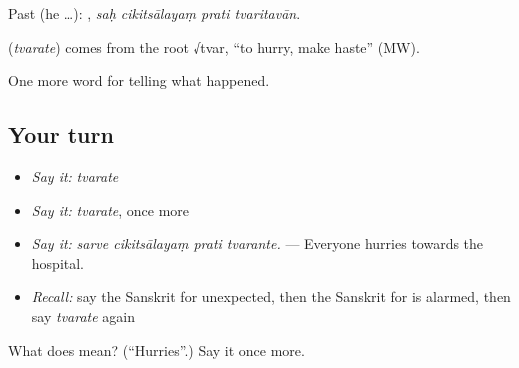 Past (he …):    , \emph{saḥ cikitsālayaṃ prati tvaritavān}.

\begin{cousinweb}
\textbf{} (\emph{tvarate}) comes from the root √tvar, \textquotedblleft{}to hurry, make haste\textquotedblright{} (MW).
\end{cousinweb}

\begin{grammarlens}[title={What you've built}]
One more word for telling what happened.
\end{grammarlens}

\subsection*{Your turn}
\begin{itemize}
\raggedright
  \item \emph{Say it:} \emph{tvarate}
  \item \emph{Say it:} \emph{tvarate}, once more
  \item \emph{Say it:} \emph{sarve cikitsālayaṃ prati tvarante.} — Everyone hurries towards the hospital.
  \item \emph{Recall:} say the Sanskrit for unexpected, then the Sanskrit for is alarmed, then say \emph{tvarate} again
\end{itemize}

\begin{tcolorbox}[breakable,colback=teal!4,colframe=teal!35!black,title={Before you move on}]
What does  mean? (\textquotedblleft{}Hurries\textquotedblright{}.) Say it once more.
\end{tcolorbox}
